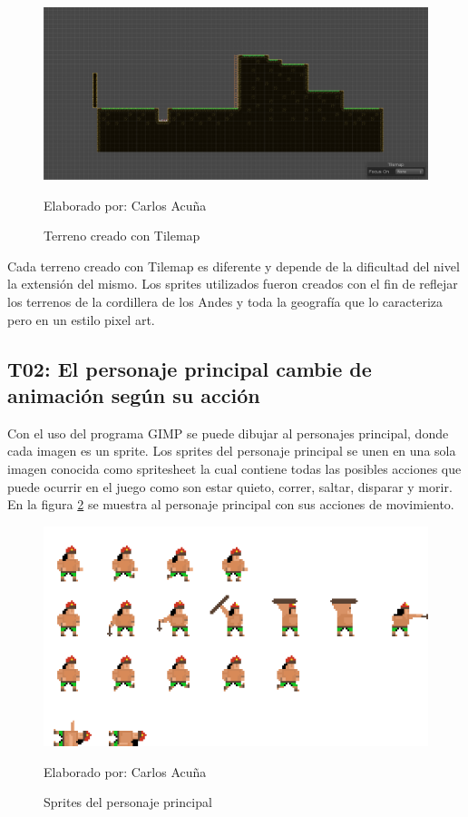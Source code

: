 \documentclass[a4paper, openright, 12pt]{report}
\begin{document}
\begin{figure}[h]
\centering
\captionsetup{justification=centering,margin=2cm}
\includegraphics[scale=0.5]{T01_01}
\caption{Terreno creado con Tilemap}
Elaborado por: Carlos Acuña
\label{fig:T01_01}
\end{figure}
\clearpage
\justify
Cada terreno creado con Tilemap es diferente y depende de la dificultad del nivel  la extensión del mismo. Los sprites utilizados fueron creados con el fin de reflejar los terrenos de la cordillera de los Andes y toda la geografía que lo caracteriza pero en un estilo pixel art.

\subsection*{T02: El personaje principal cambie de animación según su acción}
\justify
Con el uso del programa GIMP se puede dibujar al personajes principal, donde cada imagen es un sprite. Los sprites del personaje principal se unen en una sola imagen conocida como spritesheet la cual contiene todas las posibles acciones que puede ocurrir en el juego como son estar quieto, correr, saltar, disparar y morir. En la figura \ref{fig:player} se muestra al personaje principal con sus acciones de movimiento.

\begin{figure}[h]
\includegraphics[scale=1.5]{player}
\centering
\caption{Sprites del personaje principal}
Elaborado por: Carlos Acuña
\label{fig:player}
\end{figure}
\end{document}
